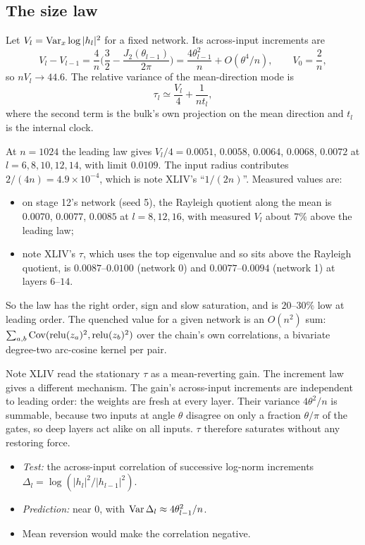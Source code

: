 \subsection{The size law}
\begin{proposition}\label{prop:size}
Let $V_l=\operatorname{Var}_x\log|h_l|^2$ for a fixed network. Its across-input increments are
\[
V_l-V_{l-1}=\frac4n\Big(\frac32-\frac{J_2(\theta_{l-1})}{2\pi}\Big)=\frac{4\theta_{l-1}^2}{n}+O(\theta^4/n),\qquad V_0=\frac2n,
\]
so $nV_l\to44.6$. The relative variance of the mean-direction mode is
\[
\tau_l\simeq\frac{V_l}4+\frac1{nt_l},
\]
where the second term is the bulk's own projection on the mean direction and $t_l$ is the internal clock.
\end{proposition}
At $n=1024$ the leading law gives $V_l/4=0.0051$, $0.0058$, $0.0064$, $0.0068$, $0.0072$ at $l=6,8,10,12,14$, with limit $0.0109$. The input radius
contributes $2/(4n)=4.9\times10^{-4}$, which is note XLIV's ``$1/(2n)$''. Measured values are:
\begin{itemize}[leftmargin=*]
\item on stage 12's network (seed 5), the Rayleigh quotient along the mean is $0.0070$, $0.0077$, $0.0085$ at $l=8,12,16$, with measured
$V_l$ about $7\%$ above the leading law;
\item note XLIV's $\tau$, which uses the top eigenvalue and so sits above the Rayleigh quotient, is $0.0087$--$0.0100$ (network 0) and
$0.0077$--$0.0094$ (network 1) at layers $6$--$14$.
\end{itemize}
So the law has the right order, sign and slow saturation, and is $20$--$30\%$ low at leading order. The quenched value for a given
network is an $O(n^2)$ sum: $\sum_{a,b}\operatorname{Cov}(\operatorname{relu}(z_a)^2,\operatorname{relu}(z_b)^2)$ over the chain's own correlations, a bivariate degree-two
arc-cosine kernel per pair.

\begin{remark}
Note XLIV read the stationary $\tau$ as a mean-reverting gain. The increment law gives a different mechanism. The gain's across-input
increments are independent to leading order: the weights are fresh at every layer. Their variance $4\theta^2/n$ is summable, because two
inputs at angle $\theta$ disagree on only a fraction $\theta/\pi$ of the gates, so deep layers act alike on all inputs. $\tau$ therefore saturates
without any restoring force.
\begin{itemize}[leftmargin=*]
\item \emph{Test:} the across-input correlation of successive log-norm increments $\Delta_l=\log(|h_l|^2/|h_{l-1}|^2)$.
\item \emph{Prediction:} near $0$, with $\operatorname{Var}\Delta_l\approx4\theta_{l-1}^2/n$.
\item Mean reversion would make the correlation negative.
\end{itemize}
\end{remark}

